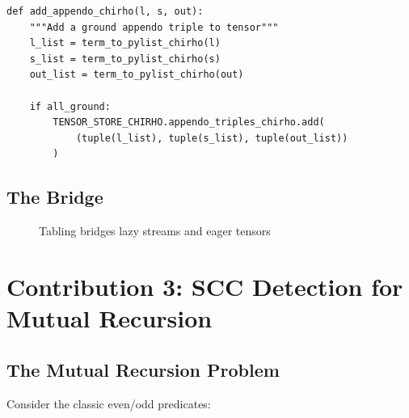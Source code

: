 \documentclass[11pt,a4paper]{article}
\begin{document}
\begin{lstlisting}[caption={Tensor population from tabling}]
def add_appendo_chirho(l, s, out):
    """Add a ground appendo triple to tensor"""
    l_list = term_to_pylist_chirho(l)
    s_list = term_to_pylist_chirho(s)
    out_list = term_to_pylist_chirho(out)

    if all_ground:
        TENSOR_STORE_CHIRHO.appendo_triples_chirho.add(
            (tuple(l_list), tuple(s_list), tuple(out_list))
        )
\end{lstlisting}

\subsection{The Bridge}
\label{subsec:bridge_chirho}

\begin{figure}[h]
\centering
{}
\caption{Tabling bridges lazy streams and eager tensors}
\label{fig:bridge_chirho}
\end{figure}

\section{Contribution 3: SCC Detection for Mutual Recursion}
\label{sec:scc_chirho}

\subsection{The Mutual Recursion Problem}
\label{subsec:mutual_problem_chirho}

Consider the classic even/odd predicates:
\end{document}
